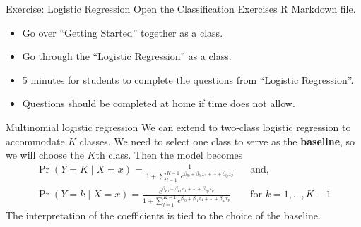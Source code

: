 \documentclass[
  ignorenonframetext,
  aspectratio=169,
]{beamer}
\begin{document}
\begin{frame}{Exercise: Logistic Regression}
\protect\hypertarget{exercise-logistic-regression}{}
Open the Classification Exercises R Markdown file.

\begin{itemize}
\item
  Go over ``Getting Started'' together as a class.
\item
  Go through the ``Logistic Regression'' as a class.
\item
  5 minutes for students to complete the questions from ``Logistic
  Regression''.
\item
  Questions should be completed at home if time does not allow.
\end{itemize}
\end{frame}

\begin{frame}{Multinomial logistic regression}
\protect\hypertarget{multinomial-logistic-regression}{}
We can extend to two-class logistic regression to accommodate \(K\)
classes. We need to select one class to serve as the \textbf{baseline},
so we will choose the \(K\)th class. Then the model becomes \[
\begin{aligned}
\operatorname{Pr}(Y=K \mid X=x)=\frac{1}{1+\sum_{l=1}^{K-1} e^{\beta_{l 0}+\beta_{l 1} x_{1}+\cdots+\beta_{l p} x_{p}}}
&& \text{and,} 
\\
\operatorname{Pr}(Y=k \mid X=x)=\frac{e^{\beta_{k 0}+\beta_{k 1} x_{1}+\cdots+\beta_{k p} x_{p}}}{1+\sum_{l=1}^{K-1} e^{\beta_{l 0}+\beta_{l 1} x_{1}+\cdots+\beta_{l p} x_{p}}} 
&& \text{for } k = 1, \dots, K-1
\end{aligned}
\] The interpretation of the coefficients is tied to the choice of the
baseline.
\end{frame}
\end{document}
